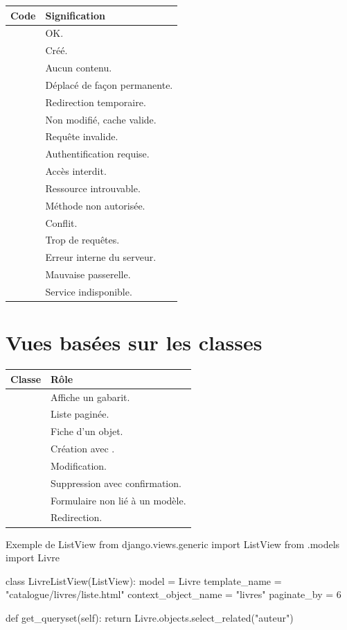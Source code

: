 \begin{longtable}{L{2.4cm} L{12.8cm}}
\toprule
\textbf{Code} & \textbf{Signification} \\
\midrule
\endhead
{} & OK. \\
 & Créé. \\
 & Aucun contenu. \\
 & Déplacé de façon permanente. \\
 & Redirection temporaire. \\
 & Non modifié, cache valide. \\
 & Requête invalide. \\
 & Authentification requise. \\
 & Accès interdit. \\
 & Ressource introuvable. \\
 & Méthode non autorisée. \\
 & Conflit. \\
 & Trop de requêtes. \\
 & Erreur interne du serveur. \\
 & Mauvaise passerelle. \\
 & Service indisponible. \\
\bottomrule
\end{longtable}

\section{Vues basées sur les classes}

\begin{longtable}{L{5.2cm} L{10cm}}
\toprule
\textbf{Classe} & \textbf{Rôle} \\
\midrule
\endhead
{} & Affiche un gabarit. \\
 & Liste paginée. \\
 & Fiche d'un objet. \\
 & Création avec . \\
 & Modification. \\
 & Suppression avec confirmation. \\
 & Formulaire non lié à un modèle. \\
 & Redirection. \\
\bottomrule
\end{longtable}

\begin{codebox}[python]{Exemple de ListView}
from django.views.generic import ListView
from .models import Livre


class LivreListView(ListView):
    model = Livre
    template_name = "catalogue/livres/liste.html"
    context_object_name = "livres"
    paginate_by = 6

    def get_queryset(self):
        return Livre.objects.select_related("auteur")
\end{codebox}
